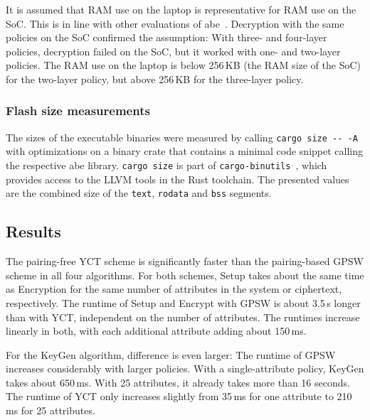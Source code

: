 It is assumed that RAM use on the laptop is representative for RAM use on the SoC.
This is in line with other evaluations of \acrshort{abe}~\cite{borgh_attribute-based_2016}. 
Decryption with the same policies on the SoC confirmed the assumption:
With three- and four-layer policies, decryption failed on the SoC, but it worked with one- and two-layer policies.
The RAM use on the laptop is below 256\,KB (the RAM size of the SoC) for the two-layer policy, but above 256\,KB for the three-layer policy.

\subsubsection{Flash size measurements}


The sizes of the executable binaries were measured by calling \verb+cargo size -- -A+ with optimizations on a binary crate that contains a minimal code snippet calling the respective \acrshort{abe} library.
\verb+cargo size+ is part of \verb+cargo-binutils+~\cite{noauthor_cargo-binutils_nodate}, which provides access to the LLVM tools in the Rust toolchain.
The presented values are the combined size of the \texttt{text}, \texttt{rodata} and \texttt{bss} segments.


\subsection{Results}
The pairing-free YCT scheme is significantly faster than the pairing-based GPSW scheme in all four algorithms. 
For both schemes, Setup takes about the same time as Encryption for the same number of attributes in the system or ciphertext, respectively.
The runtime of Setup and Encrypt with GPSW is about 3.5\,s longer than with YCT, independent on the number of attributes.
The runtimes increase linearly in both, with each additional attribute adding about 150\,ms.

For the KeyGen algorithm, difference is even larger:
The runtime of GPSW increases considerably with larger policies.
With a single-attribute policy, KeyGen takes about 650\,ms. With 25 attributes, it already takes more than 16 seconds.
The runtime of YCT only increases slightly from 35\,ms for one attribute to 210\,ms for 25 attributes.

